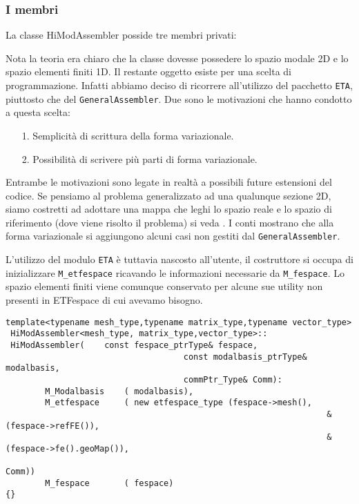  
\subsubsection{I membri}
La classe HiModAssembler posside tre membri privati:


Nota la teoria era chiaro che la classe dovesse possedere lo spazio modale 2D e lo spazio elementi finiti 1D.
Il restante oggetto esiste per una scelta di programmazione. Infatti abbiamo deciso di ricorrere all'utilizzo del pacchetto \texttt{ETA}, 
piuttosto che del \texttt{GeneralAssembler}. Due sono le motivazioni che hanno condotto a questa scelta:
\begin{itemize}
\item[1.] Semplicit\`a di scrittura della forma variazionale.
\item[2.] Possibilit\`a di scrivere pi\`u parti di forma variazionale.
\end{itemize}

Entrambe le motivazioni sono legate in realt\`a a possibili future estensioni del codice. Se pensiamo al problema generalizzato ad una qualunque 
sezione 2D, siamo costretti ad adottare una mappa che leghi lo spazio reale e lo spazio di riferimento (dove viene risolto il problema) si veda \cite{perotto:2008}. I conti 
mostrano che alla forma variazionale si aggiungono alcuni casi non gestiti dal \texttt{GeneralAssembler}.

L'utilizzo del modulo \texttt{ETA} \`e tuttavia nascosto all'utente, il costruttore si occupa di inizializzare \texttt{M\_etfespace} ricavando 
le informazioni necessarie da \texttt{M\_fespace}.
Lo spazio elementi finiti viene comunque conservato per alcune sue utility non presenti in ETFespace di cui avevamo bisogno.
\begin{lstlisting}[style=general]
 template<typename mesh_type,typename matrix_type,typename vector_type>
 HiModAssembler<mesh_type, matrix_type,vector_type>::
 HiModAssembler(	const fespace_ptrType& fespace,
 									const modalbasis_ptrType& modalbasis,
 									commPtr_Type& Comm):
 		M_Modalbasis	( modalbasis),
 		M_etfespace 	( new etfespace_type (fespace->mesh(),
 																 &(fespace->refFE()),
 																 &(fespace->fe().geoMap()),
 																 Comm))
		M_fespace		( fespace)
{} 																 
 																
\end{lstlisting}

